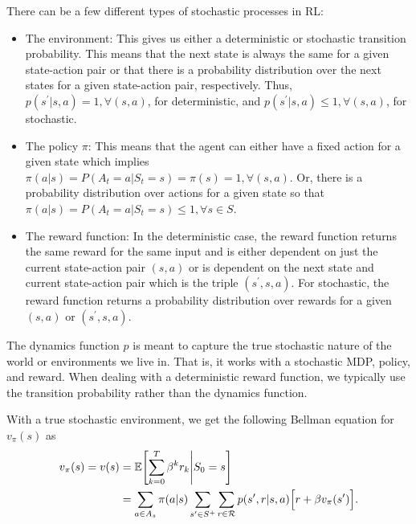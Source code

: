 There can be a few different types of stochastic processes in RL:
\begin{itemize}
    \item The environment: This gives us either a deterministic or stochastic transition probability.
    This means that the next state is always the same for a given state-action pair or that there is a probability distribution over the next states for a given state-action pair, respectively.
    Thus, $p(s^\prime|s,a)=1,\forall (s,a)$, for deterministic, and $p(s^\prime|s,a)\leq1,\forall (s,a)$, for stochastic.

    \item The policy $\pi$: This means that the agent can either have a fixed action for a given state which implies $\pi(a|s)=P(A_t=a|S_t=s)=\pi(s)=1,\forall (s,a)$.
    Or, there is a probability distribution over actions for a given state so that $\pi(a|s)=P(A_t=a|S_t=s)\leq1, \forall s\in S$.

    \item The reward function:
    In the deterministic case, the reward function returns the same reward for the same input and is either dependent on just the current state-action pair $(s,a)$ or is dependent on the next state and current state-action pair which is the triple $(s^\prime,s,a)$.
    For stochastic, the reward function returns a probability distribution over rewards for a given $(s,a)$ or $(s^\prime,s,a)$.
\end{itemize}

The dynamics function $p$ is meant to capture the true stochastic nature of the world or environments we live in.
That is, it works with a stochastic MDP, policy, and reward.
When dealing with a deterministic reward function, we typically use the transition probability rather than the dynamics function.

With a true stochastic environment, we get the following Bellman equation for $v_\pi(s)$ as
\begin{subequations}
    \label{eq:state_value}
    \begin{align}
        v_{\pi}(s)=v(s) &= \mathbb{E} \Biggl[ \sum_{k=0}^T \beta^k r_k \Biggl\lvert S_0=s  \Biggr] \label{eq:state_value_def}\\
                        &= \sum_{a \in A_s}\pi(a|s) \sum_{s^\prime\in S^+}\sum_{r \in\mathcal{R}}p(s^\prime,r|s,a) \Bigl[r + \beta v_\pi(s^\prime) \Bigr]. \label{eq:state_value_bell}
    \end{align}
\end{subequations}


